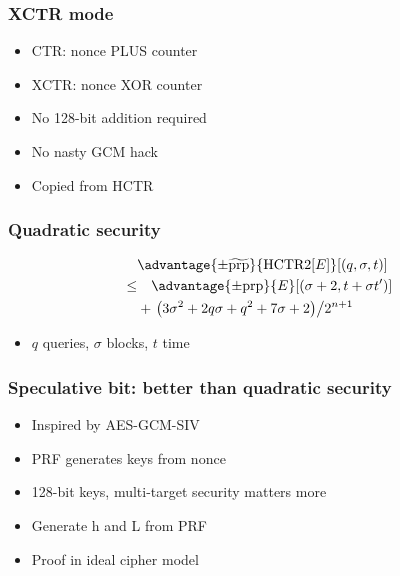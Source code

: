 \documentclass{beamer}
\begin{document}
\begin{frame}

    \frametitle{XCTR mode}
    
    \begin{itemize}
        \item CTR: nonce PLUS counter
        \item XCTR: nonce XOR counter
        \item No 128-bit addition required
        \item No nasty GCM hack
        \item Copied from HCTR
    \end{itemize}
\end{frame}
    
\begin{frame}

    \frametitle{Quadratic security}

    \begin{align*}
        &\advantage{\pm \widetilde{\mathrm{prp}}}{\HCTR[E]}[(q, \sigma, t)] \\
        \leq & \quad \advantage{\pm \mathrm{prp}}{E}[(\sigma + 2, t + \sigma t')] \\
        &+ \left.\left(3\sigma^2 + 2q\sigma + q^2 + 7\sigma + 2\right)\middle/2^{n+1}\right.
    \end{align*}
        

    \begin{itemize}
        \item \(q\) queries, \(\sigma\) blocks, \(t\) time
    \end{itemize}
\end{frame}
    
\begin{frame}
\frametitle{Speculative bit: better than quadratic security}

\begin{itemize}
    \item Inspired by AES-GCM-SIV
    \item PRF generates keys from nonce
    \item 128-bit keys, multi-target security matters more
    \item Generate h and L from PRF
    \item Proof in ideal cipher model
\end{itemize}
\end{frame}
\end{document}

